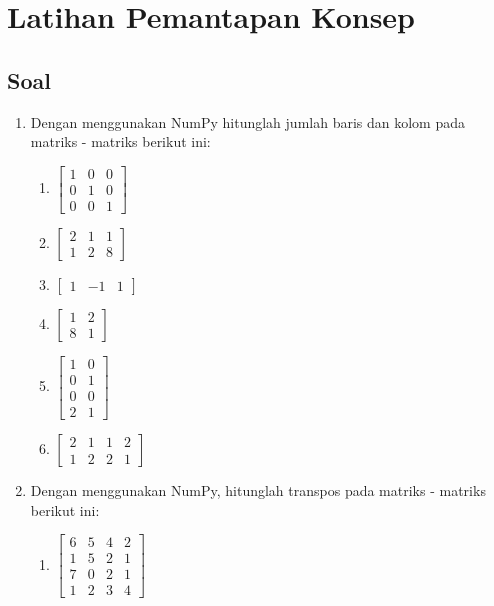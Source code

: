 \chapter{Latihan Pemantapan Konsep}
\section{Soal}
\begin{enumerate}
    \item Dengan menggunakan NumPy hitunglah jumlah baris dan kolom pada matriks - matriks berikut ini:
        \begin{enumerate}[label=(\Alph*)]
            \item $\begin{bmatrix} 1 & 0 & 0\\0 & 1 & 0\\0 & 0 & 1 \end{bmatrix}$
            \item $\begin{bmatrix}2 & 1 & 1\\ 1 & 2 & 8\end{bmatrix}$
            \item $\begin{bmatrix}1 & -1 & 1\end{bmatrix}$
            \item $\begin{bmatrix}1 & 2 \\ 8 & 1\end{bmatrix}$
            \item $\begin{bmatrix} 1 & 0 \\ 0 & 1\\ 0 & 0\\ 2 & 1 \end{bmatrix}$
            \item $\begin{bmatrix}2 & 1 & 1 & 2\\ 1 & 2 & 2 & 1 \end{bmatrix}$
        \end{enumerate}
    \item Dengan menggunakan NumPy, hitunglah transpos pada matriks - matriks berikut ini:
        \begin{enumerate}[label=(\Alph*)]
            \item $\begin{bmatrix}6 & 5 & 4 & 2\\1 & 5 & 2 & 1\\ 7 & 0 & 2 & 1\\ 1 & 2 & 3 & 4\end{bmatrix}$

\end{enumerate}
\end{enumerate}
